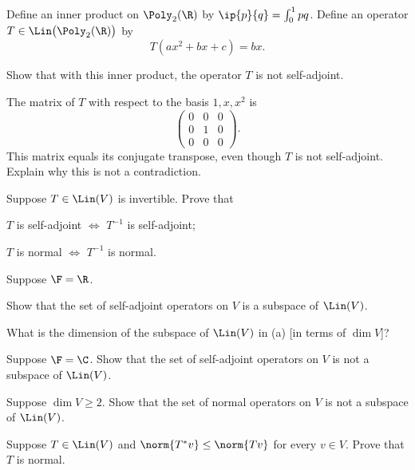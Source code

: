 \begin{exercise}
Define an inner product on $\Poly_2(\R)$ by $\ip{p}{q}=\int_0^1pq$. Define an
operator $T\in\Lin\bigl(\Poly_2(\R)\bigr)$ by
\[ T(ax^2+bx+c) = bx. \]
\begin{parts}
\item Show that with this inner product, the operator $T$ is not self-adjoint.
\item The matrix of $T$ with respect to the basis $1,x,x^2$ is
  \[ \begin{pmatrix} 0 & 0 & 0\\ 0 & 1 & 0\\ 0 & 0 & 0 \end{pmatrix}. \]
  This matrix equals its conjugate transpose, even though $T$ is not
  self-adjoint. Explain why this is not a contradiction.
\end{parts}
\end{exercise}

\begin{exercise}
Suppose $T\in\Lin(V)$ is invertible. Prove that
\begin{parts}
\item $T$ is self-adjoint $\iff$ $T^{-1}$ is self-adjoint;
\item $T$ is normal $\iff$ $T^{-1}$ is normal.
\end{parts}
\end{exercise}

\begin{exercise}
Suppose $\F=\R$.
\begin{parts}
\item Show that the set of self-adjoint operators on $V$ is a subspace of
  $\Lin(V)$.
\item What is the dimension of the subspace of $\Lin(V)$ in (a) [in terms of
  $\dim V$]?
\end{parts}
\end{exercise}

\begin{exercise}
Suppose $\F=\C$. Show that the set of self-adjoint operators on $V$ is not a
subspace of $\Lin(V)$.
\end{exercise}

\begin{exercise}
Suppose $\dim V\ge2$. Show that the set of normal operators on $V$ is not a
subspace of $\Lin(V)$.
\end{exercise}

\begin{exercise}
Suppose $T\in\Lin(V)$ and $\norm{T^*v}\le\norm{Tv}$ for every $v\in V$. Prove
that $T$ is normal.
\end{exercise}

